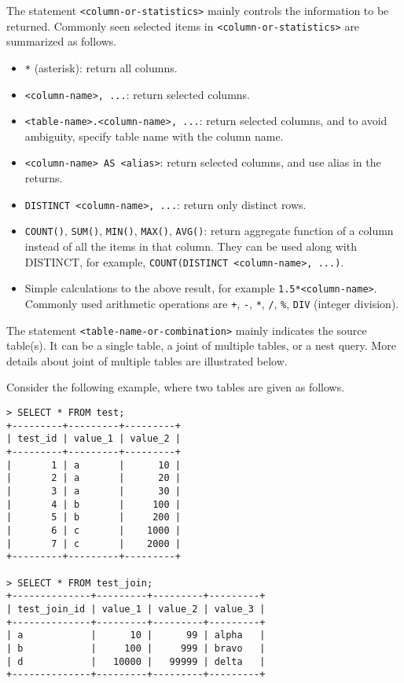 The statement \verb|<column-or-statistics>| mainly controls the information to be returned. Commonly seen selected items in \verb|<column-or-statistics>| are summarized as follows.
\begin{itemize}
  \item \verb|*| (asterisk): return all columns.
  \item \verb|<column-name>, ...|: return selected columns.
  \item \verb|<table-name>.<column-name>, ...|: return selected columns, and to avoid ambiguity, specify table name with the column name.
  \item \verb|<column-name> AS <alias>|: return selected columns, and use alias in the returns.
  \item \verb|DISTINCT <column-name>, ...|: return only distinct rows.
  \item \verb|COUNT()|, \verb|SUM()|, \verb|MIN()|, \verb|MAX()|, \verb|AVG()|: return aggregate function of a column instead of all the items in that column. They can be used along with DISTINCT, for example, \verb|COUNT(DISTINCT <column-name>, ...)|.
  \item Simple calculations to the above result, for example \verb|1.5*<column-name>|. Commonly used arithmetic operations are \verb|+|, \verb|-|, \verb|*|, \verb|/|, \verb|%|, \verb|DIV| (integer division).
\end{itemize}

The statement \verb|<table-name-or-combination>| mainly indicates the source table(s). It can be a single table, a joint of multiple tables, or a nest query. More details about joint of multiple tables are illustrated below.

Consider the following example, where two tables are given as follows.
\begin{lstlisting}
> SELECT * FROM test;
+---------+---------+---------+
| test_id | value_1 | value_2 |
+---------+---------+---------+
|       1 | a       |      10 |
|       2 | a       |      20 |
|       3 | a       |      30 |
|       4 | b       |     100 |
|       5 | b       |     200 |
|       6 | c       |    1000 |
|       7 | c       |    2000 |
+---------+---------+---------+

> SELECT * FROM test_join;
+--------------+---------+---------+---------+
| test_join_id | value_1 | value_2 | value_3 |
+--------------+---------+---------+---------+
| a            |      10 |      99 | alpha   |
| b            |     100 |     999 | bravo   |
| d            |   10000 |   99999 | delta   |
+--------------+---------+---------+---------+
\end{lstlisting}

